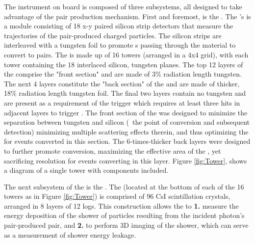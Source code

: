 The \lat{} instrument on board \Fermi{} is composed of three subsystems, all designed to take advantage of the pair production mechanism. First and foremost, is the \tkr{}. The \lat{}'s \tkr{} is a module consisting of 18 x-y paired silicon strip detectors that measure the trajectories of the pair-produced charged particles. The silicon strips are interleaved with a tungsten foil to promote \gam{}s passing through the material to convert to \ee{} pairs. The \lat{} is made up of 16 towers (arranged in a 4x4 grid), with each tower containing the 18 interlaced silicon, tungsten planes. The top 12 layers of the \tkr{} comprise the "front section" and are made of 3\% radiation length tungsten. The next 4 layers constitute the "back section" of the \tkr{} and are made of thicker, 18\% radiation length tungsten foil. The final two \tkr{} layers contain no tungsten and are present as a requirement of the \tkr{} trigger which requires at least three hits in adjacent layers to trigger \cite{lat_perf}. The front section of the \tkr{} was designed to minimize the separation between tungsten and silicon (\ie{}\ the point of conversion and subsequent detection) minimizing multiple scattering effects therein, and thus optimizing the \psf{} for events converted in this section. The 6-times-thicker back layers were designed to further promote conversion, maximizing the effective area of the \lat{}, yet sacrificing resolution for events converting in this layer. Figure \ref{fig:Tower}, shows a diagram of a single tower with \tkr{} components included.


The next subsystem of the \lat{} is the \calo{}. The \calo{} (located at the bottom of each of the 16 towers as in Figure \ref{fig:Tower}) is comprised of 96 CsI scintillation crystals, arranged in 8 layers of 12 logs. This construction allows the \calo{} to {\bf 1.} measure the energy deposition of the shower of particles resulting from the incident photon's pair-produced \ee{} pair, and {\bf 2.} to perform 3D imaging of the shower, which can serve as a measurement of shower energy leakage.

